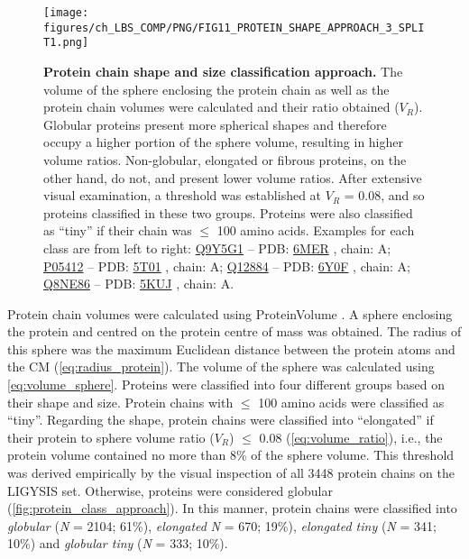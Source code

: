 \begin{figure}[htb!]
    \centering
    \texttt{[image: figures/ch\_LBS\_COMP/PNG/FIG11\_PROTEIN\_SHAPE\_APPROACH\_3\_SPLIT1.png]}
    \caption[Protein chain shape and size classification approach]{\textbf{Protein chain shape and size classification approach.} The volume of the sphere enclosing the protein chain as well as the protein chain volumes were calculated and their ratio obtained ($V_R$). Globular proteins present more spherical shapes and therefore occupy a higher portion of the sphere volume, resulting in higher volume ratios. Non-globular, elongated or fibrous proteins, on the other hand, do not, and present lower volume ratios. After extensive visual examination, a threshold was established at $V_R$ = 0.08, and so proteins classified in these two groups. Proteins were also classified as ``tiny'' if their chain was $\leq$ 100 amino acids. Examples for each class are from left to right: \href{https://www.uniprot.org/uniprotkb/Q9Y5G1/entry}{Q9Y5G1} -- PDB: \href{https://www.ebi.ac.uk/pdbe/entry/pdb/6mer}{6MER} \cite{NICLOLUDIS_2019_CADH}, chain: A; \href{https://www.uniprot.org/uniprotkb/P05412/entry}{P05412} -- PDB: \href{https://www.ebi.ac.uk/pdbe/entry/pdb/5t01}{5T01} \cite{HONG_2017_EPSTEINBARR}, chain: A; \href{https://www.uniprot.org/uniprotkb/Q12884/entry}{Q12884} -- PDB: \href{https://www.ebi.ac.uk/pdbe/entry/pdb/6Y0F}{6Y0F} \cite{PDB_6Y0F}, chain: A; \href{https://www.uniprot.org/uniprotkb/Q8NE86/entry}{Q8NE86} -- PDB: \href{https://www.ebi.ac.uk/pdbe/entry/pdb/5KUJ}{5KUJ} \cite{LEE_2016_CALCIUM}, chain: A.}
    \label{fig:protein_class_approach}
\end{figure}

Protein chain volumes were calculated using ProteinVolume \cite{CHEN_2015_PROTEINVOLUME}. A sphere enclosing the protein and centred on the protein centre of mass was obtained. The radius of this sphere was the maximum Euclidean distance \cite{300BC_EUCLID_ELEMENTS} between the protein atoms and the CM (\autoref{eq:radius_protein}). The volume of the sphere was calculated using \autoref{eq:volume_sphere}. Proteins were classified into four different groups based on their shape and size. Protein chains with $\leq$ 100 amino acids were classified as ``tiny''. Regarding the shape, protein chains were classified into ``elongated'' if their protein to sphere volume ratio ($V_R$) $\leq$ 0.08 (\autoref{eq:volume_ratio}), i.e., the protein volume contained no more than 8\% of the sphere volume. This threshold was derived empirically by the visual inspection of all 3448 protein chains on the LIGYSIS set. Otherwise, proteins were considered globular (\autoref{fig:protein_class_approach}). In this manner, protein chains were classified into \textit{globular} (\textit{N} = 2104; 61\%), \textit{elongated} \textit{N} = 670; 19\%), \textit{elongated tiny} (\textit{N} = 341; 10\%) and \textit{globular tiny} (\textit{N} = 333; 10\%).

